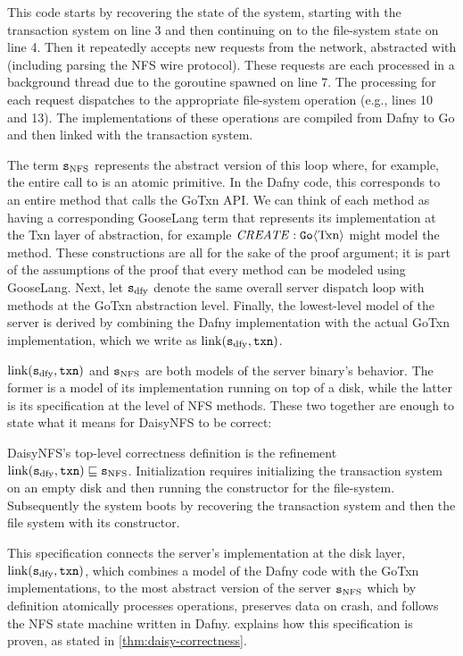 This code starts by recovering the state of the system, starting with the
transaction system on line 3 and then continuing on to the file-system state on
line 4. Then it repeatedly accepts new requests from the network, abstracted
with  (including parsing the NFS wire protocol). These requests
are each processed in a background thread due to the goroutine spawned on line
7. The processing for each request dispatches to the appropriate file-system
operation (e.g., lines 10 and 13). The implementations of these operations are
compiled from Dafny to Go and then linked with the transaction system.

The term $\texttt{s}_{\mathrm{NFS}}$ represents the abstract version of this loop where, for example,
the entire call to  is an atomic primitive. In the Dafny code,
this corresponds to an entire method that calls the GoTxn API. We can think of
each method as having a corresponding GooseLang term that represents its
implementation at the Txn layer of abstraction, for example
$\mathit{CREATE} : \mathtt{Go}\langle \mathrm{Txn} \rangle$ might model the  method.
These constructions are all for the sake of the proof argument; it is part of
the assumptions of the proof that every method can be modeled using GooseLang.
Next, let $\texttt{s}_{\mathrm{dfy}}$ denote the same overall server dispatch loop with
methods at the GoTxn abstraction level. Finally, the lowest-level model of the
server is derived by combining the Dafny implementation with the actual GoTxn
implementation, which we write as $\mathrm{link}(\texttt{s}_{\mathrm{dfy}}, \texttt{txn})$.

$\mathrm{link}(\texttt{s}_{\mathrm{dfy}}, \texttt{txn})$ and $\texttt{s}_{\mathrm{NFS}}$ are both models of the  server binary's
behavior. The former is a model of its implementation running on top of a disk,
while the latter is its specification at the level of NFS methods. These two
together are enough to state what it means for DaisyNFS to be correct:
\begin{definition}
  DaisyNFS's top-level correctness definition is the refinement
  $\mathrm{link}(\texttt{s}_{\mathrm{dfy}}, \texttt{txn}) \sqsubseteq \texttt{s}_{\mathrm{NFS}}$. Initialization requires initializing the
  transaction system on an empty disk and then running the 
  constructor for the file-system. Subsequently the system boots by recovering the
  transaction system and then the file system with its  constructor.
\end{definition}

This specification connects the server's implementation at the disk layer,
$\mathrm{link}(\texttt{s}_{\mathrm{dfy}}, \texttt{txn})$, which combines a model of the Dafny code with the GoTxn
implementations, to the most abstract version of the server $\texttt{s}_{\mathrm{NFS}}$ which by
definition atomically processes operations, preserves data on crash, and follows
the NFS state machine written in Dafny.  explains how this specification
is proven, as stated in \cref{thm:daisy-correctness}.
